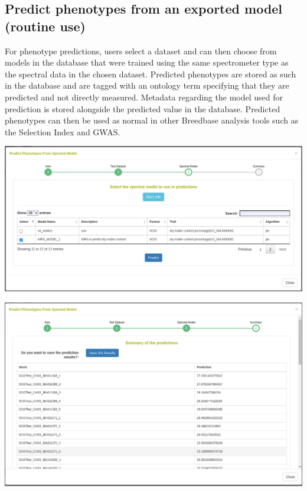 \documentclass[
  12pt,
]{book}
\begin{document}
\hypertarget{predict-phenotypes-from-an-exported-model-routine-use}{%
\subsection{Predict phenotypes from an exported model (routine use)}\label{predict-phenotypes-from-an-exported-model-routine-use}}

For phenotype predictions, users select a dataset and can then choose from models in the database that were trained using the same spectrometer type as the spectral data in the chosen dataset. Predicted phenotypes are stored as such in the database and are tagged with an ontology term specifying that they are predicted and not directly measured. Metadata regarding the model used for prediction is stored alongside the predicted value in the database. Predicted phenotypes can then be used as normal in other Breedbase analysis tools such as the Selection Index and GWAS.

\begin{center}\includegraphics[width=0.95\linewidth]{assets/images/manage_NIRS_select_model} \end{center}

\begin{center}\includegraphics[width=0.95\linewidth]{assets/images/manage_NIRS_prediction_results} \end{center}
\end{document}
